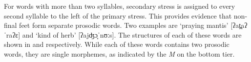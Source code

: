 \begin{exe}
\end{exe}

For words with more than two syllables,
secondary stress is assigned to every second syllable to the left of the primary stress.
This provides evidence that non-final feet form separate prosodic words.
Two examples are  `praying mantis' {\ra} [ʔat̪aʔˈraʔɛ]{}
and  `kind of herb' [ʔajʤɔ̝ˈnʊːs]{}.
The structures of each of these words are shown in 
and  respectively.
While each of these words contains two prosodic words,
they are single morphemes, as indicated by the \emph{M} on the bottom tier.



